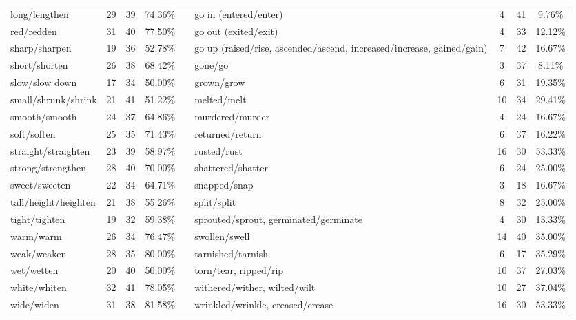 \begin{tabular}{p{3cm}ccccp{3cm}ccc}
long/lengthen & 29 & 39 & 74.36\% & & go in (entered/enter) & 4 & 41 & 9.76\% \\
red/redden & 31 & 40 & 77.50\% & & go out (exited/exit) & 4 & 33 & 12.12\% \\
sharp/sharpen & 19 & 36 & 52.78\% & & go up (raised/rise, ascended/ascend, increased/increase, gained/gain) & 7 & 42 & 16.67\% \\
short/shorten & 26 & 38 & 68.42\% & & gone/go & 3 & 37 & 8.11\% \\
slow/slow down & 17 & 34 & 50.00\% & & grown/grow & 6 & 31 & 19.35\% \\
small/shrunk/shrink & 21 & 41 & 51.22\% & & melted/melt & 10 & 34 & 29.41\% \\
smooth/smooth & 24 & 37 & 64.86\% & & murdered/murder & 4 & 24 & 16.67\% \\
soft/soften & 25 & 35 & 71.43\% & & returned/return & 6 & 37 & 16.22\% \\
straight/straighten & 23 & 39 & 58.97\% & & rusted/rust & 16 & 30 & 53.33\% \\
strong/strengthen & 28 & 40 & 70.00\% & & shattered/shatter & 6 & 24 & 25.00\% \\
sweet/sweeten & 22 & 34 & 64.71\% & & snapped/snap & 3 & 18 & 16.67\% \\
tall/height/heighten & 21 & 38 & 55.26\% & & split/split & 8 & 32 & 25.00\% \\
tight/tighten & 19 & 32 & 59.38\% & & sprouted/sprout, germinated/germinate & 4 & 30 & 13.33\% \\
warm/warm & 26 & 34 & 76.47\% & & swollen/swell & 14 & 40 & 35.00\% \\
weak/weaken & 28 & 35 & 80.00\% & & tarnished/tarnish & 6 & 17 & 35.29\% \\
wet/wetten & 20 & 40 & 50.00\% & & torn/tear, ripped/rip & 10 & 37 & 27.03\% \\
white/whiten & 32 & 41 & 78.05\% & & withered/wither, wilted/wilt & 10 & 27 & 37.04\% \\
wide/widen & 31 & 38 & 81.58\% & & wrinkled/wrinkle, creased/crease & 16 & 30 & 53.33\%
\end{tabular}